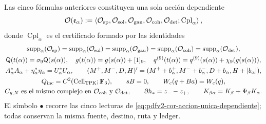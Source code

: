 Las cinco fórmulas anteriores constituyen una sola acción dependiente
\begin{equation}
\label{eq:pdfv2-cor-accion-unica-dependiente}
 \mathcal O(\mathfrak e_\alpha)
 :=\left\langle
 \mathcal O_{\rm sp},\mathcal O_{\rm sol},\mathcal O_{\rm gau},
 \mathcal O_{\rm coh},\mathcal O_{\rm det};
 \operatorname{Cpl}_\alpha
 \right\rangle,
\end{equation}
donde \(\operatorname{Cpl}_\alpha\) es el certificado formado por las
identidades
\begin{equation}
\label{eq:pdfv2-cor-acoplamientos-unicos}
 \begin{gathered}
 \operatorname{supp}_\alpha(\mathcal O_{\rm sp})
 =\operatorname{supp}_\alpha(\mathcal O_{\rm sol})
 =\operatorname{supp}_\alpha(\mathcal O_{\rm gau})
 =\operatorname{supp}_\alpha(\mathcal O_{\rm coh})
 =\operatorname{supp}_\alpha(\mathcal O_{\rm det}),\\
 \mathsf Q(t(\alpha))=\sigma_9\mathsf Q(s(\alpha)),\quad
 g(t(\alpha))=g(s(\alpha))+[1]_9,\quad
 q^{(9)}(t(\alpha))=q^{(9)}(s(\alpha))+\chi_9(g(s(\alpha))),\\
 A_\alpha^*A_\alpha+\eta_\alpha^*\eta_\alpha=U_\alpha^*U_\alpha,\qquad
 (M^+,M^-,D,H)'=(M^++b_\alpha^+,M^-+b_\alpha^-,
 D+b_\alpha,H+|b_\alpha|),\\
 Q_{\rm inc}=C^2(\operatorname{Cell}_{\rm TPK};\mathbf F_3),\qquad
 sB=0,\qquad W_c(q+Ba)=W_c(q),\\
 C_{y,N}\text{ es el mismo complejo en }
 \mathcal O_{\rm coh}\text{ y }\mathcal O_{\rm det},\qquad
 \partial h_*=z_--z_+,\qquad
 K_{\beta\alpha}=K_\beta+\Psi_\beta K_\alpha.
 \end{gathered}
\end{equation}
El símbolo \(\bullet\) recorre las cinco lecturas de
\eqref{eq:pdfv2-cor-accion-unica-dependiente}; todas conservan la misma
fuente, destino, ruta y ledger.

